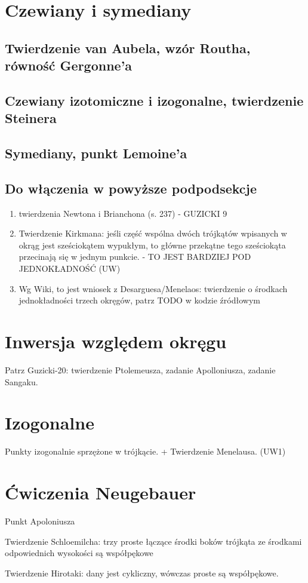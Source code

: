 \section{Czewiany i symediany}
\subsection{Twierdzenie van Aubela, wzór Routha, równość Gergonne'a}
\subsection{Czewiany izotomiczne i izogonalne, twierdzenie Steinera}
\subsection{Symediany, punkt Lemoine'a}


\subsection{Do włączenia w powyższe podpodsekcje}
\begin{enumerate}
    \item twierdzenia Newtona i Brianchona (s. 237) - GUZICKI 9
    \item Twierdzenie Kirkmana: jeśli część wspólna dwóch trójkątów wpisanych w okrąg jest sześciokątem wypukłym, to główne przekątne tego sześciokąta przecinają się w jednym punkcie. - TO JEST BARDZIEJ POD JEDNOKŁADNOŚĆ (UW)
    \item Wg Wiki, to jest wniosek z Desarguesa/Menelaos: twierdzenie o środkach jednokładności trzech okręgów, patrz TODO w kodzie źródłowym %
\end{enumerate}

\section{Inwersja względem okręgu}
Patrz Guzicki-20: twierdzenie Ptolemeusza, zadanie Apolloniusza, zadanie Sangaku.


\section{Izogonalne}
Punkty izogonalnie sprzężone w trójkącie. + Twierdzenie Menelausa. (UW1)

\section{Ćwiczenia Neugebauer}
Punkt Apoloniusza

Twierdzenie Schloemilcha: trzy proste łączące środki boków trójkąta ze środkami odpowiednich wysokości są współpękowe %

Twierdzenie Hirotaki: dany jest cykliczny, wówczas proste są współpękowe.